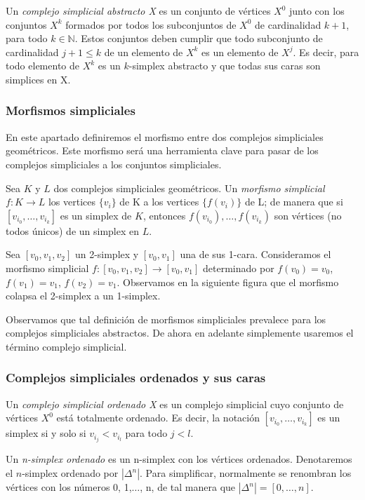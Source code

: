 \documentclass[../main.tex]{subfiles}
\begin{document}
\begin{defi}
    Un \emph{complejo simplicial abstracto X} es un conjunto de v\'ertices $X^0$ junto con los conjuntos $X^k$ formados por todos los subconjuntos de $X^0$ de cardinalidad $k+1$, para todo $k\in\mathbb{N}$.
    Estos conjuntos deben cumplir que todo subconjunto de cardinalidad $j+1\le k$ de un elemento de $X^k$ es un elemento de $X^j$. Es decir, para todo elemento de $X^k$ es un $k$-simplex abstracto y que todas sus caras son simplices en X.
\end{defi}




\subsubsection{Morfismos simpliciales}
En este apartado definiremos el morfismo entre dos complejos simpliciales geom\'etricos. Este morfismo ser\'a una herramienta clave para pasar de los complejos simpliciales a los conjuntos simpliciales.
\begin{defi}
    Sea $K$ y $L$ dos complejos simpliciales geom\'etricos. Un \emph{morfismo simplicial} $f\colon K \to L$ los vertices $\{v_i\}$ de K a los vertices $\{f(v_i)\}$ de L; de manera que si $[v_{i_0},\dots,v_{i_k}]$ es un simplex de $K$, entonces $f(v_{i_0}),\dots,f(v_{i_k})$ son v\'ertices (no todos \'unicos) de un simplex en $L$.
\end{defi}
\begin{ex}
    Sea $[v_0,v_1,v_2]$ un 2-simplex y $[v_0,v_1]$ una de sus 1-cara. Consideramos el morfismo simplicial $f\colon[v_0,v_1,v_2]\to[v_0,v_1]$ determinado por $f(v_0)=v_0$, $f(v_1)=v_1$, $f(v_2)=v_1$. Observamos en la siguiente figura que el morfismo colapsa el 2-simplex a un 1-simplex.
\end{ex}

Observamos que tal definici\'on de morfismos simpliciales prevalece para los complejos simpliciales abstractos. De ahora en adelante simplemente usaremos el t\'ermino complejo simplicial.

\subsubsection{Complejos simpliciales ordenados y sus caras}
\begin{defi}
    Un \emph{complejo simplicial ordenado X} es un complejo simplicial cuyo conjunto de v\'ertices $X^0$ est\'a totalmente ordenado. Es decir, la notaci\'on $[v_{i_0},\dots,v_{i_k}]$ es un simplex si y solo si $v_{i_j} < v_{i_l}$ para todo $j<l$.
\end{defi}
\begin{defi}
    Un \emph{n-simplex ordenado} es un n-simplex con los v\'ertices ordenados. Denotaremos el $n$-simplex ordenado por $|\Delta^n|$. Para simplificar, normalmente se renombran los v\'ertices con los n\'umeros 0, 1,$\dots$, n, de tal manera que $|\Delta^n|=[0,\dots,n]$.
\end{defi}
\end{document}
